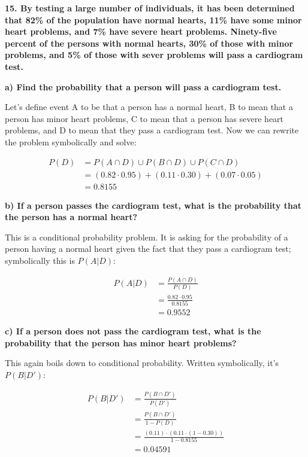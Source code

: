 \documentclass[12pt, letterpaper]{article}
\begin{document}
\textbf{15. By testing a large number of individuals, it has been determined that 82\% of the population have normal hearts, 11\% have some minor heart problems, and 7\% have severe heart problems.  Ninety-five percent of the persons with normal hearts, 30\% of those with minor problems, and 5\% of those with sever problems will pass a cardiogram test.}

\pagebreak

\textbf{a) Find the probability that a person will pass a cardiogram test.}
\begin{center}
	Let's define event A to be that a person has a normal heart, B to mean that a person has minor heart problems, C to mean that a person has severe heart problems, and D to mean that they pass a cardiogram test. Now we can rewrite the problem symbolically and solve:
\end{center}
\begin{align*}
	P(D) &= P(A \cap D) \cup P(B \cap D) \cup P(C \cap D) \\
	&= (0.82 \cdot 0.95) + (0.11 \cdot 0.30) + (0.07 \cdot 0.05) \\
	&= \boxed{0.8155}
\end{align*}

\textbf{b) If a person passes the cardiogram test, what is the probability that the person has a normal heart?}
\begin{center}
	This is a conditional probability problem. It is asking for the probability of a person having a normal heart given the fact that they pass a cardiogram test; symbolically this is $P(A|D)$:
\end{center}
\begin{align*}
	P(A|D) &= \frac{P(A \cap D)}{P(D)} \\
	&= \frac{0.82 \cdot 0.95}{0.8155} \\
	&= \boxed{0.9552}
\end{align*}

\textbf{c) If a person does not pass the cardiogram test, what is the probability that the person has minor heart problems?}
\begin{center}
	This again boils down to conditional probability. Written symbolically, it's $P(B|D')$:
\end{center}
\begin{align*}
	P(B|D') &= \frac{P(B \cap D')}{P(D')} \\
	&= \frac{P(B \cap D')}{1-P(D)} \\
	&= \frac{(0.11) \cdot (0.11 \cdot (1-0.30))}{1-0.8155} \\
	&= \boxed{0.04591}
\end{align*}
\end{document}

